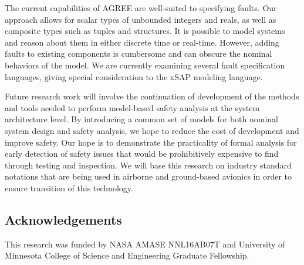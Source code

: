 The current capabilities of AGREE are well-suited to specifying faults.  Our approach allows for scalar types of unbounded integers and reals, as well as composite types such as tuples and structures.  It is possible to model systems and reason about them in either discrete time or real-time.  However, adding faults to existing components is cumbersome and can obscure the nominal behaviors of the model.  We are currently examining several fault specification languages, giving special consideration to the xSAP modeling language.

Future research work will involve the continuation of development of the methods and tools needed to perform model-based safety analysis at the system architecture level. By introducing a common set of models for both nominal system design and safety analysis, we hope to reduce the cost of development and improve safety. Our hope is to demonstrate the practicality of formal analysis for early detection of safety issues that would be prohibitively expensive to find through testing and inspection. We will base this research on industry standard notations that are being used in airborne and ground-based avionics in order to ensure transition of this technology.

\subsection*{Acknowledgements} This research was funded by NASA AMASE NNL16AB07T and University of Minnesota College of Science and Engineering Graduate Fellowship.


